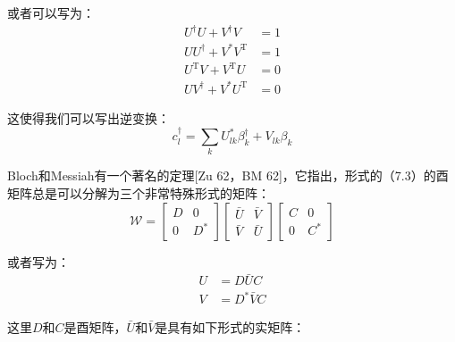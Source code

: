 或者可以写为：
\begin{align}
U^{\dagger}U+V^{\dagger}V & =1\label{eq:orthogonality of UV}\\
UU^{\dagger}+V^{*}V^{\mathrm{T}} & =1\nonumber \\
U^{\mathrm{T}}V+V^{\mathrm{T}}U & =0\nonumber \\
UV^{\dagger}+V^{*}U^{\mathrm{T}} & =0\nonumber 
\end{align}

这使得我们可以写出逆变换：
\[
c^{\dagger}_{l}=\sum_{k}U^{*}_{lk}\beta^{\dagger}_{k}+V_{lk}\beta_{k}
\]

Bloch和Messiah有一个著名的定理{[}Zu 62，BM 62{]}，它指出，形式的（7.3）的酉矩阵总是可以分解为三个非常特殊形式的矩阵：
\begin{equation}
\mathcal{W}=\begin{bmatrix}D & 0\\
0 & D^{*}
\end{bmatrix}\begin{bmatrix}\bar{U} & \bar{V}\\
\bar{V} & \bar{U}
\end{bmatrix}\begin{bmatrix}C & 0\\
0 & C^{*}
\end{bmatrix}\label{eq:decomposition of W}
\end{equation}

或者写为：
\begin{align*}
U & =D\bar{U}C\\
V & =D^{*}\bar{V}C
\end{align*}

这里$D$和$C$是酉矩阵，$\bar{U}$和$\bar{V}$是具有如下形式的实矩阵：

